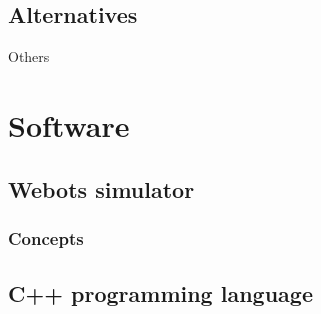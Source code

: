 \subsection{Alternatives}
Others

\section{Software}
\subsection{Webots simulator}
\label{webots}
\subsubsection{Concepts}

\subsection{C++ programming language}